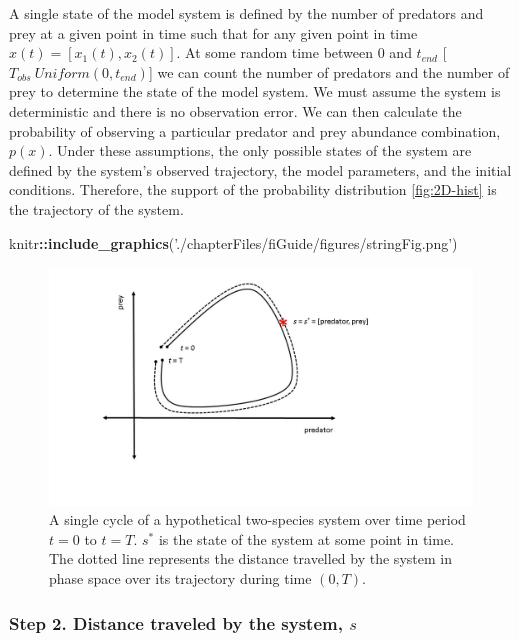 \documentclass[12pt,twoside,openany]{reedthesis}
\newenvironment{Shaded}{\begin{snugshade}}{\end{snugshade}}
\newcommand{\KeywordTok}[1]{\textcolor[rgb]{0.13,0.29,0.53}{\textbf{#1}}}
\newcommand{\StringTok}[1]{\textcolor[rgb]{0.31,0.60,0.02}{#1}}
\newcommand{\OperatorTok}[1]{\textcolor[rgb]{0.81,0.36,0.00}{\textbf{#1}}}
\newcommand{\NormalTok}[1]{#1}
\begin{document}
A single state of the model system is defined by the number of predators
and prey at a given point in time such that for any given point in time
\(x(t)=[x_1 (t),x_2 (t)]\). At some random time between 0 and
\(t_{end}\) {[}\(T_{obs} ~ Uniform(0,t_{end})\){]} we can count the
number of predators and the number of prey to determine the state of the
model system. We must assume the system is deterministic and there is no
observation error. We can then calculate the probability of observing a
particular predator and prey abundance combination, \(p(x)\). Under
these assumptions, the only possible states of the system are defined by
the system's observed trajectory, the model parameters, and the initial
conditions. Therefore, the support of the probability distribution
\ref{fig:2D-hist} is the trajectory of the system.
\begin{Shaded}
\begin{Highlighting}[]
\NormalTok{knitr}\OperatorTok{::}\KeywordTok{include_graphics}\NormalTok{(}\StringTok{'./chapterFiles/fiGuide/figures/stringFig.png'}\NormalTok{)}
\end{Highlighting}
\end{Shaded}
\begin{figure}
\includegraphics[width=17.78in]{./chapterFiles/fiGuide/figures/stringFig} \caption{A single cycle of a hypothetical two-species system over time period $t = 0$ to $t = T$. $s^*$ is the state of the system at some point in time. The dotted line represents the distance travelled by the system in phase space over its trajectory during time $(0, T)$.}\label{fig:stringFig}
\end{figure}
\subsubsection{\texorpdfstring{\textbf{Step 2.} Distance traveled by the
system,
\(s\)}{Step 2. Distance traveled by the system, s}}\label{step-2.-distance-traveled-by-the-system-s}
\end{document}
